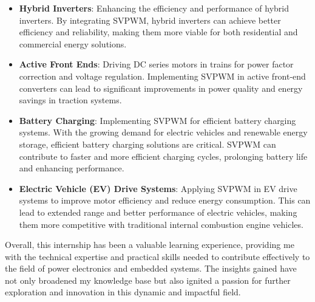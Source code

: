 \begin{itemize}
    \item \textbf{Hybrid Inverters}: Enhancing the efficiency and performance of hybrid inverters. By integrating SVPWM, hybrid inverters can achieve better efficiency and reliability, making them more viable for both residential and commercial energy solutions.
    \item \textbf{Active Front Ends}: Driving DC series motors in trains for power factor correction and voltage regulation. Implementing SVPWM in active front-end converters can lead to significant improvements in power quality and energy savings in traction systems.
    \item \textbf{Battery Charging}: Implementing SVPWM for efficient battery charging systems. With the growing demand for electric vehicles and renewable energy storage, efficient battery charging solutions are critical. SVPWM can contribute to faster and more efficient charging cycles, prolonging battery life and enhancing performance.
    \item \textbf{Electric Vehicle (EV) Drive Systems}: Applying SVPWM in EV drive systems to improve motor efficiency and reduce energy consumption. This can lead to extended range and better performance of electric vehicles, making them more competitive with traditional internal combustion engine vehicles.
\end{itemize}

\noindent
Overall, this internship has been a valuable learning experience, providing me
with the technical expertise and practical skills needed to contribute
effectively to the field of power electronics and embedded systems. The
insights gained have not only broadened my knowledge base but also ignited a
passion for further exploration and innovation in this dynamic and impactful
field.